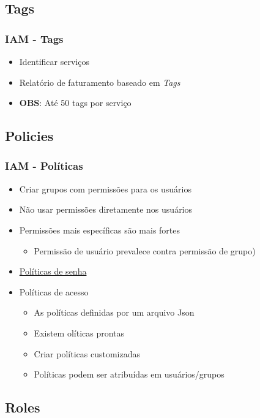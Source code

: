\subsection{Tags}

\begin{frame}
	\frametitle{IAM - Tags}
	\begin{itemize}
		\item Identificar serviços
		\item Relatório de faturamento baseado em \textit{Tags}
		\item \textbf{OBS}: Até 50 tags por serviço
	\end{itemize}
\end{frame}

\subsection{Policies}

\begin{frame}[allowframebreaks]
	\frametitle{IAM - Políticas}
	\begin{itemize}
		\item Criar grupos com permissões para os usuários
		\item Não usar permissões diretamente nos usuários
		\item Permissões mais específicas são mais fortes
			\begin{itemize}
				\item Permissão de usuário prevalece contra permissão de grupo)
			\end{itemize}
		\item \href{https://docs.aws.amazon.com/pt_br/IAM/latest/UserGuide/id_credentials_passwords_account-policy.html}{Políticas de senha}
		\framebreak
		\item Políticas de acesso
			\begin{itemize}
				\item As políticas definidas por um arquivo Json
				\item Existem olíticas prontas
				\item Criar políticas customizadas
				\item Políticas podem ser atribuídas em usuários/grupos
			\end{itemize}
	\end{itemize}
\end{frame}

\subsection{Roles}

